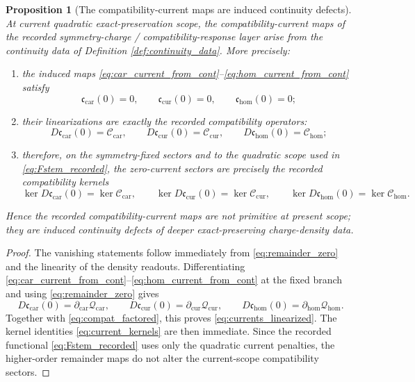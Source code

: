 \documentclass[11pt]{article}
\newcommand{\TensorCompat}{\mathcal C_{\mathrm{car}}}
\newcommand{\CurCompat}{\mathcal C_{\mathrm{cur}}}
\newcommand{\HomCompat}{\mathcal C_{\mathrm{hom}}}
\newcommand{\TensorCurrent}{\mathfrak c_{\mathrm{car}}}
\newcommand{\CurCurrent}{\mathfrak c_{\mathrm{cur}}}
\newcommand{\HomCurrent}{\mathfrak c_{\mathrm{hom}}}
\newcommand{\TensorDensity}{\mathcal Q_{\mathrm{car}}}
\newcommand{\CurDensity}{\mathcal Q_{\mathrm{cur}}}
\newcommand{\HomDensity}{\mathcal Q_{\mathrm{hom}}}
\newcommand{\TensorCont}{\partial_{\mathrm{car}}}
\newcommand{\CurCont}{\partial_{\mathrm{cur}}}
\newcommand{\HomCont}{\partial_{\mathrm{hom}}}
\newtheorem{proposition}{Proposition}
\begin{document}
\begin{proposition}[The compatibility-current maps are induced continuity defects]
\label{prop:currents_from_continuity}
At current quadratic exact-preservation scope, the compatibility-current maps of the recorded symmetry-charge / compatibility-response layer arise from the continuity data of Definition \ref{def:continuity_data}. More precisely:
\begin{enumerate}
    \item the induced maps \eqref{eq:car_current_from_cont}--\eqref{eq:hom_current_from_cont} satisfy
    \[
    \TensorCurrent(0)=0,\qquad
    \CurCurrent(0)=0,\qquad
    \HomCurrent(0)=0;
    \]
    \item their linearizations are exactly the recorded compatibility operators:
    \begin{equation}
    D\TensorCurrent(0)=\TensorCompat,\qquad
    D\CurCurrent(0)=\CurCompat,\qquad
    D\HomCurrent(0)=\HomCompat;
    \label{eq:currents_linearized}
    \end{equation}
    \item therefore, on the symmetry-fixed sectors and to the quadratic scope used in \eqref{eq:Fstem_recorded}, the zero-current sectors are precisely the recorded compatibility kernels
    \begin{equation}
    \ker D\TensorCurrent(0)=\ker\TensorCompat,\qquad
    \ker D\CurCurrent(0)=\ker\CurCompat,\qquad
    \ker D\HomCurrent(0)=\ker\HomCompat.
    \label{eq:current_kernels}
    \end{equation}
\end{enumerate}
Hence the recorded compatibility-current maps are not primitive at present scope; they are induced continuity defects of deeper exact-preserving charge-density data.
\end{proposition}

\begin{proof}
The vanishing statements follow immediately from \eqref{eq:remainder_zero} and the linearity of the density readouts. Differentiating \eqref{eq:car_current_from_cont}--\eqref{eq:hom_current_from_cont} at the fixed branch and using \eqref{eq:remainder_zero} gives
\[
D\TensorCurrent(0)=\TensorCont\TensorDensity,\qquad
D\CurCurrent(0)=\CurCont\CurDensity,\qquad
D\HomCurrent(0)=\HomCont\HomDensity.
\]
Together with \eqref{eq:compat_factored}, this proves \eqref{eq:currents_linearized}. The kernel identities \eqref{eq:current_kernels} are then immediate. Since the recorded functional \eqref{eq:Fstem_recorded} uses only the quadratic current penalties, the higher-order remainder maps do not alter the current-scope compatibility sectors.
\end{proof}
\end{document}
